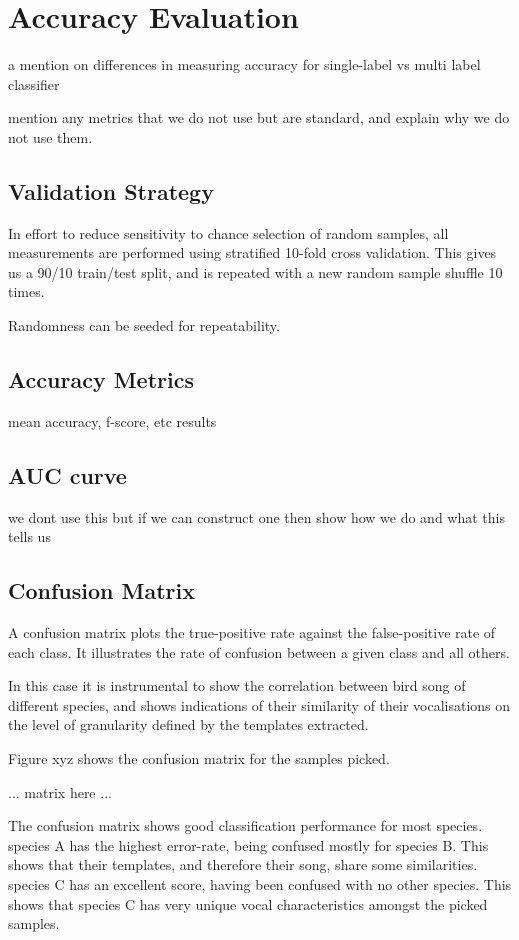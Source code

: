 \section{Accuracy Evaluation}

a mention on differences in measuring accuracy for single-label vs multi
label classifier

mention any metrics that we do not use but are standard, and explain
why we do not use them.

\subsection{Validation Strategy}
In effort to reduce sensitivity to chance selection of random samples, all
measurements are performed using stratified 10-fold cross validation.
This gives us a 90/10 train/test split, and is repeated with a new random sample
shuffle 10 times.

Randomness can be seeded for repeatability.

\subsection{Accuracy Metrics}
mean accuracy, f-score, etc
results

\subsection{AUC curve}
we dont use this but if we can construct one then show how we do and what
this tells us

\subsection{Confusion Matrix}
A confusion matrix plots the true-positive rate against the false-positive rate
of each class.
It illustrates the rate of confusion between a given class and all others.

In this case it is instrumental to show the correlation between bird song of
different species, and shows indications of their similarity of their
vocalisations on the level of granularity defined by the templates extracted.

Figure xyz shows the confusion matrix for the samples picked.

... matrix here ...

The confusion matrix shows good classification performance for most species.\\

species A has the highest error-rate, being confused mostly for species B.
This shows that their templates, and therefore their song, share some
similarities.\\

species C has an excellent score, having been confused with no other species.
This shows that species C has very unique vocal characteristics amongst the
picked samples.
